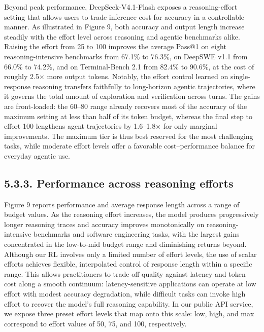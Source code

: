 \documentclass[
  10
]{article}
\begin{document}
Beyond peak performance, DeepSeek-V4.1-Flash exposes a reasoning-effort
setting that allows users to trade inference cost for accuracy in a
controllable manner. As illustrated in Figure 9, both accuracy and
output length increase steadily with the effort level across reasoning
and agentic benchmarks alike. Raising the effort from 25 to 100 improves
the average Pass@1 on eight reasoning-intensive benchmarks from 67.1\%
to 76.3\%, on DeepSWE v1.1 from 66.0\% to 74.2\%, and on Terminal-Bench
2.1 from 82.4\% to 90.6\%, at the cost of roughly 2.5$\times$ more output
tokens. Notably, the effort control learned on single-response reasoning
transfers faithfully to long-horizon agentic trajectories, where it
governs the total amount of exploration and verification across turns.
The gains are front-loaded: the 60--80 range already recovers most of
the accuracy of the maximum setting at less than half of its token
budget, whereas the final step to effort 100 lengthens agent
trajectories by 1.6--1.8$\times$ for only marginal improvements. The maximum
tier is thus best reserved for the most challenging tasks, while
moderate effort levels offer a favorable cost--performance balance for
everyday agentic use.

\subsection{5.3.3. Performance across reasoning
efforts}\label{performance-across-reasoning-efforts}

Figure 9 reports performance and average response length across a range
of budget values. As the reasoning effort increases, the model produces
progressively longer reasoning traces and accuracy improves
monotonically on reasoning-intensive benchmarks and software engineering
tasks, with the largest gains concentrated in the low-to-mid budget
range and diminishing returns beyond. Although our RL involves only a
limited number of effort levels, the use of scalar efforts achieves
flexible, interpolated control of response length within a specific
range. This allows practitioners to trade off quality against latency
and token cost along a smooth continuum: latency-sensitive applications
can operate at low effort with modest accuracy degradation, while
difficult tasks can invoke high effort to recover the model's full
reasoning capability. In our public API service, we expose three preset
effort levels that map onto this scale: low, high, and max correspond to
effort values of 50, 75, and 100, respectively.
\end{document}
